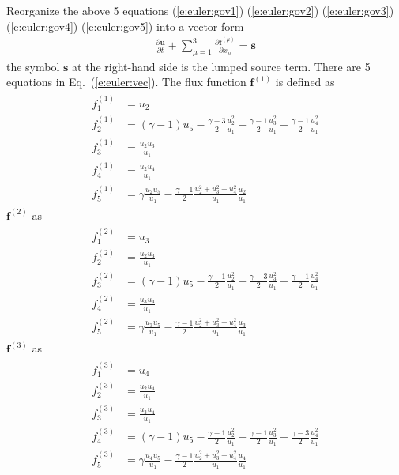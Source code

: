 \documentclass{turgon}
\begin{document}
Reorganize the above 5 equations (\ref{e:euler:gov1}) (\ref{e:euler:gov2})
(\ref{e:euler:gov3}) (\ref{e:euler:gov4}) (\ref{e:euler:gov5}) into a vector
form
%
\begin{align}
  \frac{\partial\mathbf{u}}{\partial t}
  + \sum_{\mu=1}^3 \frac{\partial\mathbf{f}^{(\mu)}}{\partial x_{\mu}}
  = \mathbf{s}
  \label{e:euler:vec}
\end{align}
%
the symbol $\mathbf{s}$ at the right-hand side is the lumped source term.
There are 5 equations in Eq.~(\ref{e:euler:vec}).
The flux function $\mathbf{f}^{(1)}$ is defined as
%
\begin{align}
  \begin{aligned}
    f^{(1)}_1 &= u_2 \\
    f^{(1)}_2 &= (\gamma-1)u_5 - \frac{\gamma-3}{2}\frac{u_2^2}{u_1}
    - \frac{\gamma-1}{2}\frac{u_3^2}{u_1}
    - \frac{\gamma-1}{2}\frac{u_4^2}{u_1} \\
    f^{(1)}_3 &= \frac{u_2u_3}{u_1} \\
    f^{(1)}_4 &= \frac{u_2u_4}{u_1} \\
    f^{(1)}_5 &= \gamma\frac{u_2u_5}{u_1}
    - \frac{\gamma-1}{2}\frac{u_2^2+u_3^2+u_4^2}{u_1}\frac{u_2}{u_1}
  \end{aligned}
  \label{e:euler:flux1}
\end{align}
%
$\mathbf{f}^{(2)}$ as
%
\begin{align}
  \begin{aligned}
    f^{(2)}_1 &= u_3 \\
    f^{(2)}_2 &= \frac{u_2 u_3}{u_1} \\
    f^{(2)}_3 &= (\gamma-1)u_5 - \frac{\gamma-1}{2}\frac{u_2^2}{u_1}
    - \frac{\gamma-3}{2}\frac{u_3^2}{u_1}
    - \frac{\gamma-1}{2}\frac{u_4^2}{u_1} \\
    f^{(2)}_4 &= \frac{u_3 u_4}{u_1} \\
    f^{(2)}_5 &= \gamma\frac{u_3u_5}{u_1}
    - \frac{\gamma-1}{2}\frac{u_2^2+u_3^2+u_4^2}{u_1}\frac{u_3}{u_1}
  \end{aligned}
  \label{e:euler:flux2}
\end{align}
%
$\mathbf{f}^{(3)}$ as
%
\begin{align}
  \begin{aligned}
    f^{(3)}_1 &= u_4 \\
    f^{(3)}_2 &= \frac{u_2 u_4}{u_1} \\
    f^{(3)}_3 &= \frac{u_3 u_4}{u_1} \\
    f^{(3)}_4 &= (\gamma-1)u_5 - \frac{\gamma-1}{2}\frac{u_2^2}{u_1}
    - \frac{\gamma-1}{2}\frac{u_3^2}{u_1}
    - \frac{\gamma-3}{2}\frac{u_4^2}{u_1} \\
    f^{(3)}_5 &= \gamma\frac{u_4u_5}{u_1}
    - \frac{\gamma-1}{2}\frac{u_2^2+u_3^2+u_4^2}{u_1}\frac{u_4}{u_1}
  \end{aligned}
  \label{e:euler:flux3}
\end{align}
\end{document}

